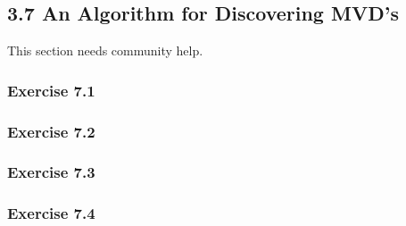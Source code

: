 \documentclass[../../main.tex]{subfiles}
\begin{document}
\subsection{3.7 An Algorithm for Discovering MVD's}

This section needs community help.

\subsubsection*{Exercise 7.1}

\subsubsection*{Exercise 7.2}

\subsubsection*{Exercise 7.3}

\subsubsection*{Exercise 7.4}
\end{document}
